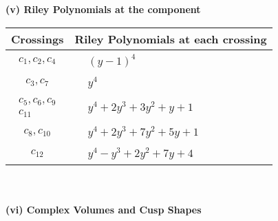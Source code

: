 \documentclass[1p]{elsarticle_modified}
\theoremstyle{definition}
\begin{document}
\newpage\renewcommand{\arraystretch}{1}
\flushleft \textbf{(v) Riley Polynomials at the component}\newline \\
\begin{tabular}{m{50pt}|m{274pt}}
Crossings & \hspace{64pt}Riley Polynomials at each crossing \\
\hline $$\begin{aligned}c_{1},c_{2},c_{4}\end{aligned}$$&$\begin{aligned}
&(y-1)^4
\end{aligned}$\\
\hline $$\begin{aligned}c_{3},c_{7}\end{aligned}$$&$\begin{aligned}
&y^4
\end{aligned}$\\
\hline $$\begin{aligned}c_{5},c_{6},c_{9}\\c_{11}\end{aligned}$$&$\begin{aligned}
&y^4+2 y^3+3 y^2+y+1
\end{aligned}$\\
\hline $$\begin{aligned}c_{8},c_{10}\end{aligned}$$&$\begin{aligned}
&y^4+2 y^3+7 y^2+5 y+1
\end{aligned}$\\
\hline $$\begin{aligned}c_{12}\end{aligned}$$&$\begin{aligned}
&y^4- y^3+2 y^2+7 y+4
\end{aligned}$\\
\hline
\end{tabular}\\~\\
\newpage\flushleft \textbf{(vi) Complex Volumes and Cusp Shapes}
\end{document}
